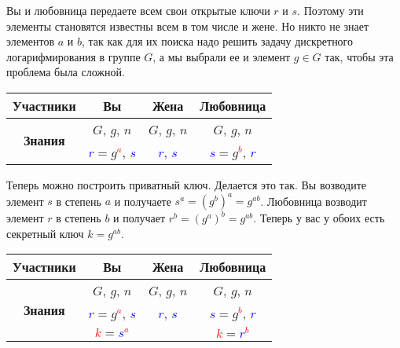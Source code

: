 Вы и любовница передаете всем свои открытые ключи $r$ и $s$.
Поэтому эти элементы становятся известны всем в том числе и жене.
Но никто не знает элементов $a$ и $b$, так как для их поиска надо решить задачу дискретного логарифмирования в группе $G$, а мы выбрали ее и элемент $g\in G$ так, чтобы эта проблема была сложной.
\begin{center}
\begin{tabular}{|c|c|c|c|}
\hline
{\bf Участники}&{Вы}&{Жена}&{Любовница}\\
\hline
\multirow{2}{*}{\bf Знания}&{\textcolor{OliveGreen}{$G$}, \textcolor{OliveGreen}{$g$}, \textcolor{OliveGreen}{$n$}}&{\textcolor{OliveGreen}{$G$}, \textcolor{OliveGreen}{$g$}, \textcolor{OliveGreen}{$n$}}&{\textcolor{OliveGreen}{$G$}, \textcolor{OliveGreen}{$g$}, \textcolor{OliveGreen}{$n$}}\\
{}&{ \textcolor{blue}{$r$}$=$\textcolor{OliveGreen}{$ g$}\textcolor{red}{${}^a$}, \textcolor{blue}{$s$}}&{\textcolor{blue}{$r$, $s$}}&{ \textcolor{blue}{$s$}$=$\textcolor{OliveGreen}{$g$}\textcolor{red}{${}^b$}, \textcolor{blue}{$r$}}\\
\hline
\end{tabular}
\end{center}

Теперь можно построить приватный ключ.
Делается это так.
Вы возводите элемент $s$ в степень $a$ и получаете $s^a = (g^b)^a = g^{ab}$.
Любовница возводит элемент $r$ в степень $b$ и получает $r^b = (g^a)^b = g^{ab}$.
Теперь у вас у обоих есть секретный ключ $k = g^{ab}$.
\begin{center}
\begin{tabular}{|c|c|c|c|}
\hline
{\bf Участники}&{Вы}&{Жена}&{Любовница}\\
\hline
\multirow{3}{*}{\bf Знания}&{\textcolor{OliveGreen}{$G$}, \textcolor{OliveGreen}{$g$}, \textcolor{OliveGreen}{$n$}}&{\textcolor{OliveGreen}{$G$}, \textcolor{OliveGreen}{$g$}, \textcolor{OliveGreen}{$n$}}&{\textcolor{OliveGreen}{$G$}, \textcolor{OliveGreen}{$g$}, \textcolor{OliveGreen}{$n$}}\\
{}&{ \textcolor{blue}{$r$}$=$\textcolor{OliveGreen}{$ g$}\textcolor{red}{${}^a$}, \textcolor{blue}{$s$}}&{\textcolor{blue}{$r$, $s$}}&{ \textcolor{blue}{$s$}$=$\textcolor{OliveGreen}{$g$}\textcolor{red}{${}^b$}, \textcolor{blue}{$r$}}\\
{}&{ \textcolor{red}{$k$}$=$\textcolor{blue}{$s$}\textcolor{red}{${}^a$}}&{}&{ \textcolor{red}{$k$}$=$\textcolor{blue}{$r$}\textcolor{red}{${}^b$}}\\
\hline
\end{tabular}
\end{center}

